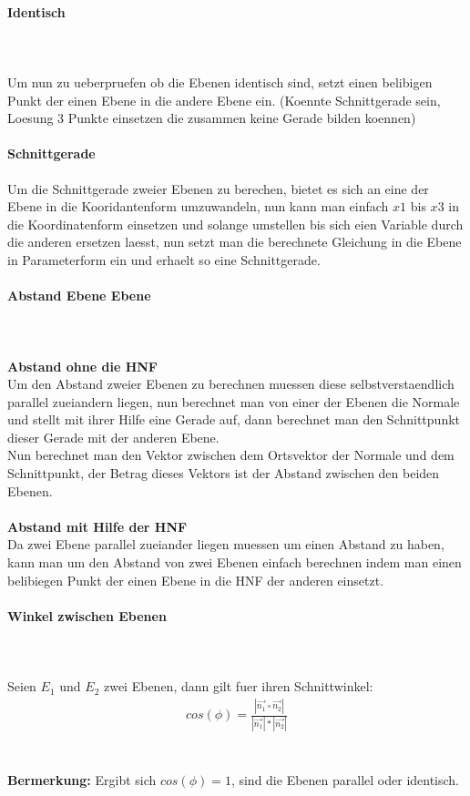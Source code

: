 \documentclass[a4paper]{article} %
\begin{document}
	\paragraph{Identisch}
		\hspace{0 cm} \\ \noindent \\
	Um nun zu ueberpruefen ob die Ebenen identisch sind, setzt einen belibigen Punkt der einen Ebene in die andere Ebene ein.
	(Koennte Schnittgerade sein, Loesung 3 Punkte einsetzen die zusammen keine Gerade bilden koennen)
	\paragraph{Schnittgerade}
	Um die Schnittgerade zweier Ebenen zu berechen, bietet es sich an eine der Ebene in die Kooridantenform umzuwandeln,
	nun kann man einfach $x1$ bis $x3$ in die Koordinatenform einsetzen und solange umstellen bis sich eien Variable durch die anderen ersetzen laesst, nun setzt man die berechnete Gleichung in die Ebene in Parameterform ein und erhaelt so eine Schnittgerade.
	\paragraph{Abstand Ebene Ebene}
		\hspace{0 cm} \\ \noindent \\
	\textbf{Abstand ohne die HNF}\\
	Um den Abstand zweier Ebenen zu berechnen muessen diese selbstverstaendlich parallel zueiandern liegen, nun berechnet man von einer der Ebenen die Normale und stellt mit ihrer Hilfe eine Gerade auf, dann berechnet man den Schnittpunkt dieser Gerade mit der anderen Ebene.\\
	Nun berechnet man den Vektor zwischen dem Ortsvektor der Normale und dem Schnittpunkt, der Betrag dieses Vektors ist der Abstand zwischen den beiden Ebenen.\\\\
	\textbf{Abstand mit Hilfe der HNF}\\
	Da zwei Ebene parallel zueiander liegen muessen um einen Abstand zu haben, kann man um den Abstand von zwei Ebenen einfach berechnen indem man einen belibiegen Punkt der einen Ebene in die HNF der anderen einsetzt.
	\paragraph{Winkel zwischen Ebenen}
	\hspace{0 cm} \\ \noindent \\
	Seien $E_1$ und $E_2$ zwei Ebenen, dann gilt fuer ihren Schnittwinkel:
	\begin{align*}
		cos(\phi)= \frac{|\vec{n_1} \circ \vec{n_2}|}{|\vec{n_1}|*|\vec{n_2}|}
	\end{align*}\\\\
	\textbf{Bermerkung:}
	Ergibt sich $cos(\phi)=1$, sind die Ebenen parallel oder identisch.
\end{document}
